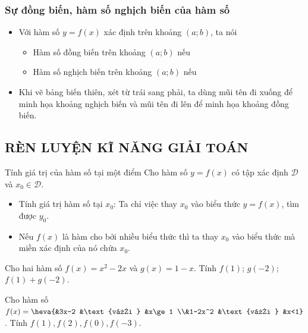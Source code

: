 \subsubsection{Sự đồng biến, hàm số nghịch biến của hàm số}
\begin{itemize}
	\item [\iconMT]  Với hàm số $y=f(x)$ xác định trên khoảng $(a;b)$, ta nói
	\begin{itemize}
		\item [\iconCH] Hàm số đồng biến trên khoảng $(a;b)$ nếu
		\item [\iconCH] Hàm số nghịch biến trên khoảng $(a;b)$ nếu
	\end{itemize}
	\item [\iconMT]  Khi vẽ bảng biến thiên, xét từ trái sang phải, ta dùng mũi tên đi xuống để minh họa khoảng nghịch biến và mũi tên đi lên để minh họa khoảng đồng biến. 
\end{itemize}

\subsection{RÈN LUYỆN KĨ NĂNG GIẢI TOÁN}
\begin{dang}{Tính giá trị của hàm số tại một điểm}
	Cho hàm số $y=f(x)$ có tập xác định $\mathscr{D}$ và $x_0 \in \mathscr{D}$.
	\begin{itemize}
		\item[\faPencilSquareO] Tính giá trị hàm số tại $x_0$: Ta chỉ việc thay $x_0$ vào biểu thức $y=f(x)$, tìm được $y_0$.
		\item[\faPencilSquareO] Nếu $f(x)$ là hàm cho bởi nhiều biểu thức thì ta thay $x_0$ vào biểu thức mà miền xác định của nó chứa $x_0$.
	\end{itemize}
\end{dang}

\begin{vd}
	Cho hai hàm số $f(x)=x^2-2x$ và $g(x)=1-x$. Tính $f(1)$; $g(-2)$; $f(1)+g(-2)$.
\end{vd}

\begin{vd}
	Cho hàm số $f(x)=\heva{&3x-2 &\text{với } &x\ge 1 \\&1-2x^2 &\text{với } &x<1}$. Tính $f(1), f(2), f(0), f(-3)$.
\end{vd}


